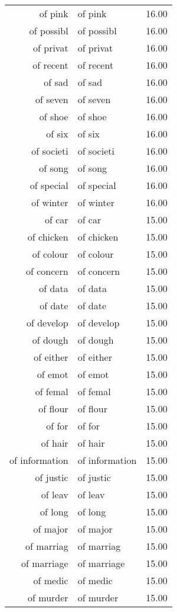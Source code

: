 \begin{table}[ht]
\begin{tabular}{rlr}
  of pink & of pink & 16.00 \\ 
  of possibl & of possibl & 16.00 \\ 
  of privat & of privat & 16.00 \\ 
  of recent & of recent & 16.00 \\ 
  of sad & of sad & 16.00 \\ 
  of seven & of seven & 16.00 \\ 
  of shoe & of shoe & 16.00 \\ 
  of six & of six & 16.00 \\ 
  of societi & of societi & 16.00 \\ 
  of song & of song & 16.00 \\ 
  of special & of special & 16.00 \\ 
  of winter & of winter & 16.00 \\ 
  of car & of car & 15.00 \\ 
  of chicken & of chicken & 15.00 \\ 
  of colour & of colour & 15.00 \\ 
  of concern & of concern & 15.00 \\ 
  of data & of data & 15.00 \\ 
  of date & of date & 15.00 \\ 
  of develop & of develop & 15.00 \\ 
  of dough & of dough & 15.00 \\ 
  of either & of either & 15.00 \\ 
  of emot & of emot & 15.00 \\ 
  of femal & of femal & 15.00 \\ 
  of flour & of flour & 15.00 \\ 
  of for & of for & 15.00 \\ 
  of hair & of hair & 15.00 \\ 
  of information & of information & 15.00 \\ 
  of justic & of justic & 15.00 \\ 
  of leav & of leav & 15.00 \\ 
  of long & of long & 15.00 \\ 
  of major & of major & 15.00 \\ 
  of marriag & of marriag & 15.00 \\ 
  of marriage & of marriage & 15.00 \\ 
  of medic & of medic & 15.00 \\ 
  of murder & of murder & 15.00 \\ 

\end{tabular}
\end{table}
